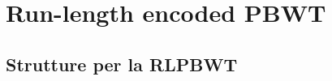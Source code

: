 \documentclass[]{beamer}
\def\SMEM{\mbox{\rm {\sf SMEM}}}
\begin{document}
\section{Run-length encoded PBWT}
\subsection{Strutture per la RLPBWT}
\end{document}
